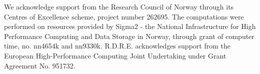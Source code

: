 \documentclass[journal=jctcce, manuscript=article]{achemso}
\begin{document}
\begin{acknowledgement}
We acknowledge support from the Research Council of Norway through its Centres of Excellence scheme, project number 262695. 
The computations were performed on resources provided by Sigma2 - the National Infrastructure for High Performance Computing and 
Data Storage in Norway, through grant of computer time, no.
nn4654k and nn9330k.
R.D.R.E. acknowledges support from the European High-Performance Computing  Joint Undertaking under Grant Agreement No. 951732.
\end{acknowledgement}




\end{document}
